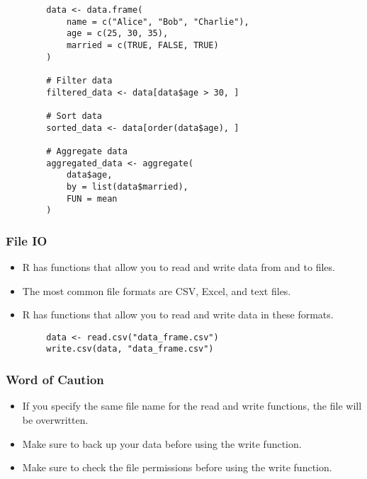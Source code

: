\documentclass[serif, 9pt, aspectratio=32]{beamer}
\begin{document}
\begin{frame}[fragile]
    \begin{lstlisting}
        data <- data.frame(
            name = c("Alice", "Bob", "Charlie"),
            age = c(25, 30, 35),
            married = c(TRUE, FALSE, TRUE)
        )

        # Filter data
        filtered_data <- data[data$age > 30, ]

        # Sort data
        sorted_data <- data[order(data$age), ]

        # Aggregate data
        aggregated_data <- aggregate(
            data$age,
            by = list(data$married),
            FUN = mean
        )
    \end{lstlisting}
\end{frame}

\begin{frame}
    \centering
    \frametitle{File IO}
    \begin{itemize}
        \setlength{\itemsep}{2em}
        \item R has functions that allow you to read and write data from and to files.
        \item The most common file formats are CSV, Excel, and text files.
        \item R has functions that allow you to read and write data in these formats.
    \end{itemize}
\end{frame}

\begin{frame}[fragile]
    \begin{lstlisting}
        data <- read.csv("data_frame.csv")
        write.csv(data, "data_frame.csv")
    \end{lstlisting}
\end{frame}

\begin{frame}
    \centering
    \frametitle{Word of Caution}
    \begin{itemize}
        \setlength{\itemsep}{2em}
        \item If you specify the same file name for the read and write functions, the file will be overwritten.
        \item Make sure to back up your data before using the write function.
        \item Make sure to check the file permissions before using the write function.
    \end{itemize}
\end{frame}
\end{document}
